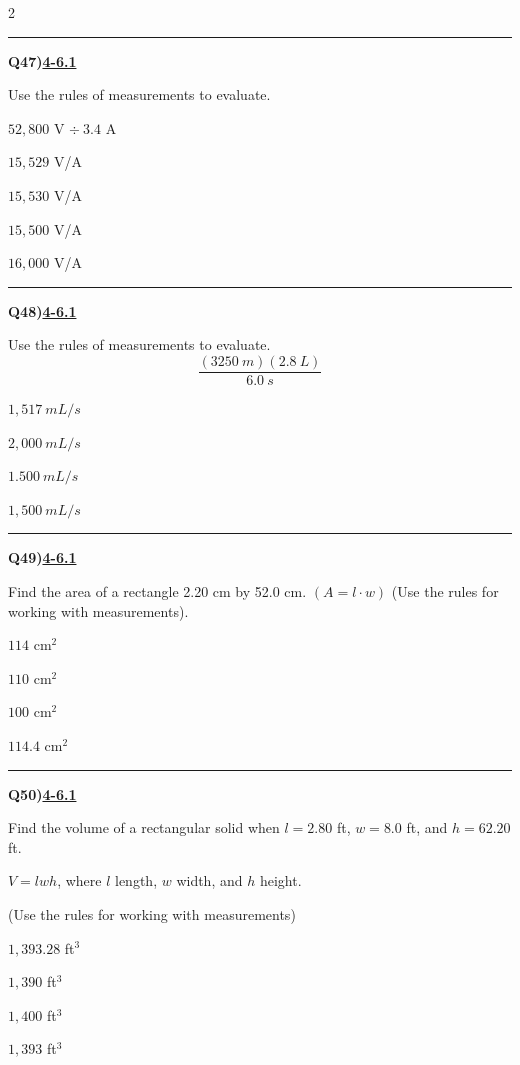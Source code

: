 \documentclass[11pt]{article}
\newenvironment{Qbox}[2]{%
  \par\medskip\noindent\begin{minipage}{\linewidth}%
  \hrule\medskip%
  \textbf{Q#1)}\hfill\textbf{\underline{#2}}\par\smallskip%
}{\par\end{minipage}\par\medskip}
\begin{document}
\begin{multicols}{2}
\begin{Qbox}{47}{4-6.1}
Use the rules of measurements to evaluate.\par\medskip $52{,}800$ V $\div\ 3.4$ A
\begin{choices}
  \item $15{,}529$ V/A
  \item $15{,}530$ V/A
  \item $15{,}500$ V/A
  \item $16{,}000$ V/A
\end{choices}
\end{Qbox}

\begin{Qbox}{48}{4-6.1}
Use the rules of measurements to evaluate.\[ \frac{(3250\ m)(2.8\ L)}{6.0\ s} \]
\begin{choices}
  \item $1{,}517\ mL/s$
  \item $2{,}000\ mL/s$
  \item $1.500\ mL/s$
  \item $1{,}500\ mL/s$
\end{choices}
\end{Qbox}

\begin{Qbox}{49}{4-6.1}
Find the area of a rectangle 2.20 cm by 52.0 cm. $(A=l\cdot w)$ (Use the rules for working with measurements).
\begin{choices}
  \item $114$ cm$^2$
  \item $110$ cm$^2$
  \item $100$ cm$^2$
  \item $114.4$ cm$^2$
\end{choices}
\end{Qbox}

\begin{Qbox}{50}{4-6.1}
Find the volume of a rectangular solid when $l=2.80$ ft, $w=8.0$ ft, and $h=62.20$ ft.\par\medskip $V=lwh$, where $l$ length, $w$ width, and $h$ height.\par\medskip (Use the rules for working with measurements)
\begin{choices}
  \item $1{,}393.28$ ft$^3$
  \item $1{,}390$ ft$^3$
  \item $1{,}400$ ft$^3$
  \item $1{,}393$ ft$^3$
\end{choices}
\end{Qbox}

\end{multicols}
\end{document}
